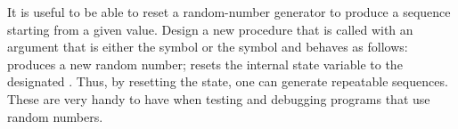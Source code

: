 \begin{exercise}
	\label{Exercise 3.6}
	It is useful to be able to reset a random-number generator to produce a sequence starting from a given value.
	Design a new  procedure that is called with an argument that is either the symbol  or the symbol  and behaves as follows:
	 produces a new random number;
	 resets the internal state variable to the designated .
	Thus, by resetting the state, one can generate repeatable sequences.
	These are very handy to have when testing and debugging programs that use random numbers.
\end{exercise}
